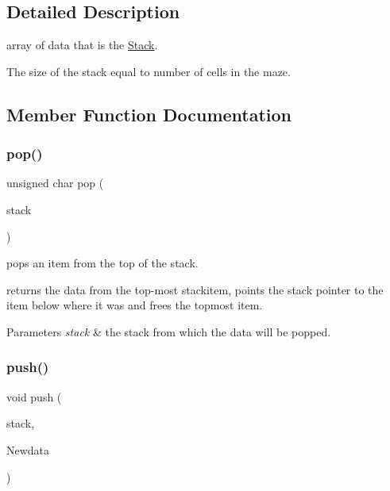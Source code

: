 \subsection{Detailed Description}
array of data that is the \hyperlink{structStack}{Stack}. 

The size of the stack equal to number of cells in the maze. 

\subsection{Member Function Documentation}
\mbox{\label{structStack_aa2c179f9f71cccf23778012d4e9326de}} 
\subsubsection{\texorpdfstring{pop()}{pop()}}
{\footnotesize\ttfamily unsigned char pop (\begin{DoxyParamCaption}\item[{\hyperlink{structStack}{Stack} $\ast$}]{stack }\end{DoxyParamCaption})}



pops an item from the top of the stack. 

returns the data from the top-\/most stackitem, points the stack pointer to the item below where it was and frees the topmost item.


\begin{DoxyParams}{Parameters}
{\em stack} & the stack from which the data will be popped. \\
\hline
\end{DoxyParams}
\mbox{\label{structStack_a0bd90a5dfacc09f2df0382c269e0236b}} 
\subsubsection{\texorpdfstring{push()}{push()}}
{\footnotesize\ttfamily void push (\begin{DoxyParamCaption}\item[{\hyperlink{structStack}{Stack} $\ast$}]{stack,  }\item[{unsigned char}]{Newdata }\end{DoxyParamCaption})}




